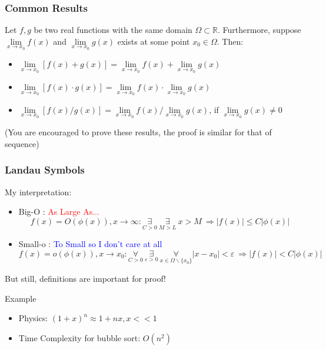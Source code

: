 \documentclass{beamer}
\begin{document}
\begin{frame}
    \frametitle{Common Results}

    Let $f, g$ be two real functions with the same domain $\Omega\subset\mathbb{R}$. 
    Furthermore, suppose $\underset{x\to x_0}{\lim} ⁡f(x)$ and $\underset{x\to x_0}{\lim}⁡g(x)$ 
    exists at some point $x_0\in \Omega$. Then:
    \begin{itemize}
        \item $\underset{x\to x_0}{\lim} [⁡f(x)+g(x)]= \underset{x\to x_0}{\lim} ⁡f(x)+ \underset{x\to x_0}{\lim}⁡g(x)$
        \item $\underset{x\to x_0}{\lim} [⁡f(x)\cdot g(x)]= \underset{x\to x_0}{\lim} ⁡f(x)\cdot \underset{x\to x_0}{\lim}⁡g(x)$
        \item $\underset{x\to x_0}{\lim} [⁡f(x)/ g(x)]= \underset{x\to x_0}{\lim} ⁡f(x)/ \underset{x\to x_0}{\lim}⁡g(x)$, if $\underset{x\to x_0}{\lim}⁡g(x)\neq 0$
    \end{itemize} 
    \vspace{2em}
    (You are encouraged to prove these results, the proof is similar for that of sequence)
\end{frame}
\begin{frame}
    \frametitle{Landau Symbols}
    My interpretation:
    \begin{itemize}
        \item Big-O : \textcolor{red}{As Large As...}
        $$f(x)=O(\phi(x)),x\to \infty: \underset{C>0}{\exists}~\underset{M>L}{\exists}~x>M~\Rightarrow |f(x)|\leq C|\phi(x)|$$
        \item Small-o : \textcolor{blue}{To Small so I don't care at all}
        $$f(x)=o(\phi(x)),x\to x_0: \underset{C>0}{\forall}~\underset{\varepsilon>0}{\exists}~\underset{x \in \Omega\backslash \{x_0\}}{\forall}|x-x_0|<\varepsilon~\Rightarrow |f(x)|< C|\phi(x)|$$
    \end{itemize}
    But still, definitions are important for proof!
    \vspace{3em}
    \begin{block}{Example}
        \begin{itemize}
            \item Physics: $(1+x)^n\approx 1+nx, x<< 1$ 
            \item Time Complexity for bubble sort: $O(n^2)$
        \end{itemize}
    \end{block}
\end{frame}
\end{document}

